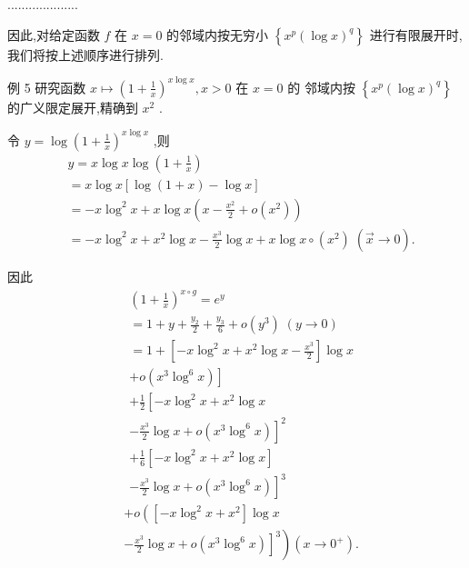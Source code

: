 ....................

因此,对给定函数 $f$ 在 $x = 0$ 的邻域内按无穷小 $\left\{  {{x}^{p}{\left( \log x\right) }^{q}}\right\}$ 进行有限展开时, 我们将按上述顺序进行排列.

例 5 研究函数 $x \mapsto  {\left( 1 + \frac{1}{x}\right) }^{x\log x},x > 0$ 在 $x = 0$ 的 邻域内按 $\left\{  {{x}^{p}{\left( \log x\right) }^{q}}\right\}$ 的广义限定展开,精确到 ${x}^{2}$ .

令 $y = \log {\left( 1 + \frac{1}{x}\right) }^{x\log x}$ ,则
\begin{align*}
	&y = x\log x\log \left( {1 + \frac{1}{x}}\right)\\
	&= x\log x\left\lbrack  {\log \left( {1 + x}\right)  - \log x}\right\rbrack\\
	&=  - x{\log }^{2}x + x\log x\left( {x - \frac{{x}^{2}}{2} + o\left( {x}^{2}\right) }\right)\\
	&=  - x{\log }^{2}x + {x}^{2}\log x - \frac{{x}^{3}}{2}\log x + x\log x \circ  \left( {x}^{2}\right) \;\left( {\overrightarrow{x} \rightarrow  \widehat{0}}\right) .
\end{align*}

因此
\begin{align*}
	&{\left( 1 + \frac{1}{x}\right) }^{x \circ  g} = {e}^{y}\\
	&= 1 + y + \frac{{y}_{2}}{2} + \frac{{y}_{3}}{6} + o\left( {y}^{3}\right) \;\left( {y \rightarrow  0}\right)\\
	&= 1 + \left\lbrack  {-x{\log }^{2}x + {x}^{2}\log x - \frac{{x}^{3}}{2}}\right\rbrack  \log x\\
	&\left. {+o\left( {{x}^{3}{\log }^{6}x}\right) }\right\rbrack\\
	&+ \frac{1}{2}\left\lbrack  {-x{\log }^{2}x + {x}^{2}\log x}\right.\\
	&{\left. -\frac{{x}^{3}}{2}\log x + o\left( {x}^{3}{\log }^{6}x\right) \right\rbrack  }^{2}\\
	&+ \frac{1}{6}\left\lbrack  {-x{\log }^{2}x + {x}^{2}\log x}\right\rbrack\\
	&{\left. -\frac{{x}^{3}}{2}\log x + o\left( {x}^{3}{\log }^{6}x\right) \right\rbrack  }^{3}
\end{align*}
\begin{align*}
	&+ o\left( {\left\lbrack  {-x{\log }^{2}x + {x}^{2}}\right\rbrack  \log x}\right.\\
	&\left. {\left. -\frac{{x}^{3}}{2}\log x + o\left( {x}^{3}{\log }^{6}x\right) \right\rbrack  }^{3}\right) \left( {x \rightarrow  {0}^{ + }}\right) .
\end{align*}

